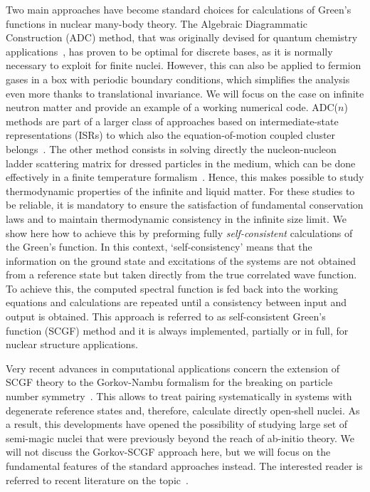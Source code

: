 Two main approaches have become standard choices for calculations of Green's functions in nuclear many-body theory.
%
The Algebraic Diagrammatic Construction (ADC) method, that was originally devised for quantum chemistry applications~\cite{ch11_Schirmer1982ADC2,ch11_Schirmer1983ADCn}, has proven to be optimal for discrete bases, as it is normally necessary to exploit for finite nuclei. However, this can also be applied to fermion gases in a box with periodic boundary conditions, which  simplifies the analysis even more thanks to translational invariance. We will focus on the case on infinite neutron matter and provide an example of a working numerical code.
%
ADC($n$) methods are part of a larger class of approaches based on intermediate-state representations (ISRs) to which also the equation-of-motion coupled cluster belongs~\cite{ch11_Mertins1996ISR1,ch11_Mertins1996ISR2}.
%
The other method consists in solving directly the nucleon-nucleon ladder scattering matrix for dressed particles in the medium, which can be done effectively in a finite temperature formalism~\cite{ch11_Frick2004PhD,ch11_Rios2007PhD}. Hence, this makes possible to study thermodynamic properties of the infinite and liquid matter. For these studies to be reliable, it is mandatory to ensure the satisfaction of fundamental conservation laws and to maintain thermodynamic consistency in the infinite size limit. We show here how to achieve this by preforming fully {\em self-consistent} calculations of the Green's function. In this context, `self-consistency' means that the information on the ground state and excitations of the systems are not obtained from a reference state but taken directly from the true correlated wave function. To achieve this, the computed spectral function is fed back into the working equations and calculations are repeated until a consistency between input and output is obtained.  This approach 
is referred to as self-consistent Green's function (SCGF) method and it is always implemented, partially or in full, for nuclear structure applications.

Very recent advances in computational applications concern the extension of SCGF theory to the Gorkov-Nambu formalism for the breaking on particle number symmetry~\cite{ch11_VdSluys1993,ch11_Soma2011GkvI,ch11_Idini2012}. This allows to  treat pairing systematically in systems with degenerate reference states and, therefore, calculate directly open-shell nuclei. As a result, this developments have  opened the possibility of  studying large set of semi-magic nuclei that were previously beyond the reach of ab-initio theory. We will not discuss the Gorkov-SCGF approach here, but we will focus on the fundamental features of the standard approaches instead. The interested reader is referred to recent literature on the topic~\cite{ch11_Soma2011GkvI,ch11_Soma2013rc,ch11_Soma2014Lanc}.

